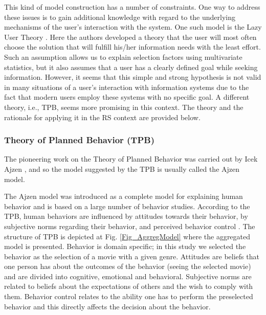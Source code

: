 \documentclass{llncs}
\begin{document}

This kind of model construction has a number of constraints. One way to address these issues is to gain additional knowledge with regard to the underlying mechanisms of the user’s interaction with the system. %
One such model is the Lazy User Theory \cite{Tetard2009}. Here the authors developed a theory that the user will most often choose the solution that will fulfill his/her information needs with the least effort. Such an assumption allows us to explain selection factors using multivariate statistics, but it also assumes that a user has a clearly defined goal while seeking information. However, it seems that this simple and strong hypothesis is not valid in many situations of a user’s interaction with information systems due to the fact that modern users employ these systems with no specific goal. A different theory, i.e., TPB, seems more promising in this context. The theory and the rationale for applying it in the RS context are provided below. 


\subsubsection{Theory of Planned Behavior (TPB)}\label{SubSubSec_TPB}

 
The pioneering work on the Theory of Planned Behavior was carried out by Icek Ajzen \cite{Ajzen1991}, and so the model suggested by the TPB is usually called the Ajzen model. 

The Ajzen model was introduced as a complete model for explaining human behavior and is based on a large number of behavior studies. According to the TPB, human behaviors are influenced by attitudes towards their behavior, by subjective norms regarding their behavior, and perceived behavior control \cite{Ajzen1991}. The structure of TPB is depicted at Fig. \ref{Fig_AggregModel} where the aggregated model is presented. Behavior is domain specific; in this study we selected the behavior as the selection of a movie with a given genre. Attitudes are beliefs that one person has about the outcomes of the behavior (seeing the selected movie) and are divided into cognitive, emotional and behavioral. Subjective norms are related to beliefs about the expectations of others and the wish to comply with them. Behavior control relates to the ability one has to perform the preselected behavior and this directly affects the decision about the behavior. 
\end{document}

